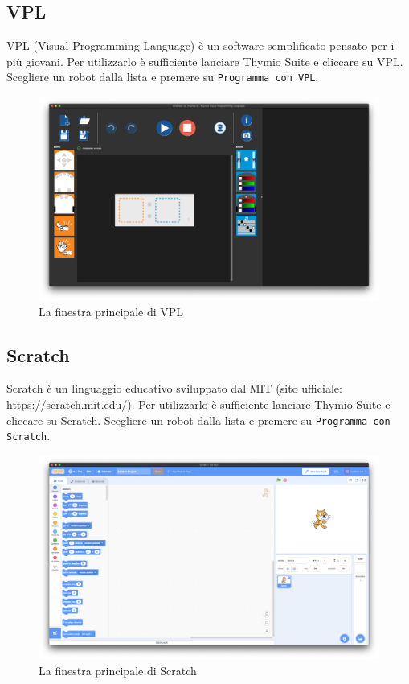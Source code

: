 \documentclass[12pt]{article}
\begin{document}
	\newpage
		
	\subsection{VPL}
	
		VPL (Visual Programming Language) è un software semplificato pensato per i più giovani. Per utilizzarlo è sufficiente lanciare Thymio Suite e cliccare su VPL. Scegliere un robot dalla lista e premere su \texttt{Programma con VPL}.
		
		\begin{figure}[H]
			\includegraphics[width=\textwidth]{img/vpl.png}
			\caption{La finestra principale di VPL}
			\label{main_vpl}
		\end{figure}
		
	\newpage
		
	\subsection{Scratch}
	
		Scratch è un linguaggio educativo sviluppato dal MIT (sito ufficiale: \url{https://scratch.mit.edu/}). Per utilizzarlo è sufficiente lanciare Thymio Suite e cliccare su Scratch. Scegliere un robot dalla lista e premere su \texttt{Programma con Scratch}.
		
		\begin{figure}[H]
			\includegraphics[width=\textwidth]{img/scratch.png}
			\caption{La finestra principale di Scratch}
			\label{main_scratch}
		\end{figure}
		
\end{document}
